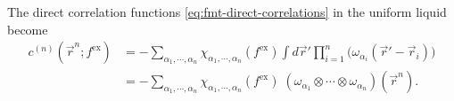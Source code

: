 The direct correlation functions \eqref{eq:fmt-direct-correlations} in the uniform liquid become \cite{RosenfeldJCP1990}
\begin{equation}\label{eq:fmt-direct-correlations-uniform-density}
  \begin{split}
    c^{(n)}(\vec{r}^n; f^\mathrm{ex})
    &=
    - \sum_{\alpha_1, \cdots, \alpha_n}
    \chi_{\alpha_1, \cdots, \alpha_n}(f^\mathrm{ex})
    \int d\vec{r}'
    \prod_{i=1}^n \Big( \omega_{\alpha_i}(\vec{r}' - \vec{r}_i) \Big)
    \\ &=
    - \sum_{\alpha_1, \cdots, \alpha_n}
    \chi_{\alpha_1, \cdots, \alpha_n}(f^\mathrm{ex}) \;
    (\omega_{\alpha_1} \otimes \cdots \otimes \omega_{\alpha_n})
    (\vec{r}^n).
  \end{split}
\end{equation}

\vspace{0.5em}

